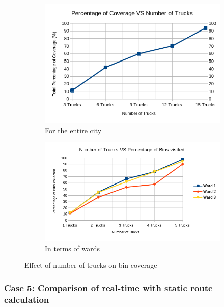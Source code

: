 \documentclass[12pt]{article}
\begin{document}
\begin{figure}[H]
    \centering
    \begin{subfigure}{0.5\textwidth}
        \centering
        \includegraphics[width=\linewidth]{coverage_VS_number_of_trucks.png}
        \caption{For the entire city}\label{figc1}
    \end{subfigure}%
    \begin{subfigure}{0.5\textwidth}
        \centering
        \includegraphics[width=\linewidth]{number_of_trucks_VS_bins_visited.png}
        \caption{In terms of wards}\label{figc2}
    \end{subfigure}
    \caption{Effect of number of trucks on bin coverage}
    \label{fig3}
\end{figure}

\subsubsection*{Case 5: Comparison of real-time with static route calculation}
\end{document}
